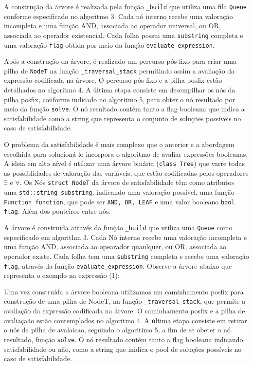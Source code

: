 \documentclass{article}
\begin{document}
A construção da árvore é realizada pela função \texttt{\_build} que utiliza uma fila \texttt{Queue} conforme especificado no algoritmo 3. Cada nó interno recebe uma valoração incompleta e uma função AND, associada ao operador universal, ou OR, associada ao operador existencial. Cada folha possui uma \texttt{substring} completa e uma valoração \texttt{flag} obtida por meio da função \texttt{evaluate\_expression}.

Após a construção da árvore, é realizado um percurso pós-fixo para criar uma pilha de \texttt{NodeT} na função \texttt{\_traversal\_stack} permitindo assim a avaliação da expressão codificada na árvore. O percurso pós-fixo e a pilha posfix estão detalhados no algoritmo 4. A última etapa consiste em desempilhar os nós da pilha posfix, conforme indicado no algoritmo 5, para obter o nó resultado por meio da função \texttt{solve}. O nó resultado contém tanto a flag booleana que indica a satisfabilidade como a string que representa o conjunto de soluções possíveis no caso de satisfabilidade.

O problema da satisfabilidade é mais complexo que o anterior e a abordagem escolhida para solucioná-lo incorpora o algoritmo de avaliar expressões booleanas. A ideia em alto nível é utilizar uma árvore binária (\texttt{class Tree}) que varre todas as possiblidades de valoração das variáveis, que estão codificadas pelos operadores $\exists$ e $\forall$. Os Nós \texttt{struct NodeT} da árvore de satisfabilidade têm como atributos uma \texttt{std::string substring}, indicando uma valoração possível, uma função \texttt{Function function}, que pode ser \texttt{AND, OR, LEAF} e uma valor booleano \texttt{bool flag}. Além dos ponteiros entre nós.

A árvore é construída através da função \texttt{\_build} que utiliza uma \texttt{Queue} como especificado em algorithm 3. Cada Nó interno recebe uma valoração incompleta e uma função AND, associada ao opearador quaulquer,  ou OR, associada ao operador existe. Cada folha tem uma \texttt{substring} completa e recebe uma valoração \texttt{flag}, através da função \texttt{evaluate\_expression}. Observe a árvore abaixo que representa o exemplo na expressão (1):

Uma vez construída a árvore booleana utilizamos um caminhamento posfix para construção de uma pilha de NodeT, na função \texttt{\_traversal\_stack}, que permite a avaliação da expressão codificada na árvore. O caminhamento posfix e a pilha de avaliaçaão estão contemplados no algoritmo 4. A última etapa consiste em retirar o nós da pilha de avalaicao, seguindo o algoritimo 5, a fim de se obeter o nó resultado, função \texttt{solve}. O nó resultado contém tanto a flag booleana indicando satisfabilidade ou não, como a string que inidica o pool de soluções possíveis no caso de satisfabilidade.
\end{document}
